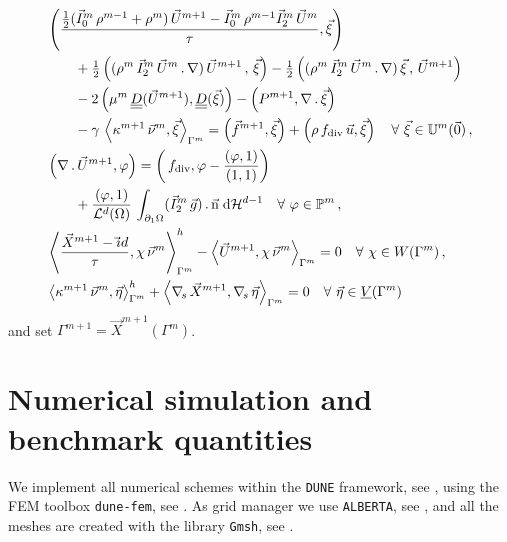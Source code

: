 \documentclass[a4paper,12pt,onecolumn]{article}
\newcommand{\vol}{\mathcal{L}^d}
\newcommand{\dH}[1]{\;{\rm d}{\cal H}^{#1}} %
\newcommand{\Vh}{\underline{V}(\Gamma^m)}
\newcommand{\Wh}{W(\Gamma^m)}
\newcommand{\uspacedisc}[2]{\mathbb{U}^{#2}(\vec{#1})}
\newcommand{\pspace}{\mathbb{P}}
\newcommand{\nabs}{\nabla_{\!s}}
\newcommand{\id}{\rm id}
\newcommand{\unitn}{\vec{\rm n}}
\newcommand{\mat}[1]{\underline{\underline{#1}}\rule{0pt}{0pt}}
\begin{document}
\begin{subequations}
\begin{align}
& \left(\frac{\tfrac{1}{2}(\vec I^m_0\,\rho^{m-1}+\rho^m)\,\vec U^{m+1} -
\vec I^m_0\,\rho^{m-1} \vec I^m_2\,\vec U^m}{\tau}, \vec \xi \right)\nonumber \\
& \qquad + \tfrac{1}{2}\left((\rho^m\,\vec I^m_2\,\vec U^m\,.\,\nabla)\,
\vec U^{m+1}\,,\,\vec \xi \right) - \tfrac{1}{2} \left((\rho^m\,
\vec I^m_2 \, \vec U^m\,.\,\nabla)\,\vec \xi\,,\,\vec U^{m+1} \right)
\nonumber \\
& \qquad - 2\left(\mu^m\,\mat D(\vec U^{m+1}), \mat D(\vec \xi) \right)
- \left(P^{m+1}, \nabla\,.\,\vec \xi\right) \nonumber \\
& \qquad - \gamma\,\left\langle
\kappa^{m+1}\,\vec\nu^m,\vec\xi\right\rangle_{\Gamma^m}
= \left(\vec f^{m+1}, \vec \xi\right)
+\left(\rho\,f_{\rm{div}}\,\vec u,\vec\xi\right) \quad \forall\ \vec\xi \in
\uspacedisc{0}{m}\,,\\
& \left(\nabla\,.\,\vec U^{m+1}, \varphi\right)  = \left(\,f_{\rm{div}},
\varphi-\frac{\left(\varphi,1\right)}{\left(1,1\right)}\right) \nonumber \\
& \qquad +\frac{\left(\varphi, 1\right)}{\vol(\Omega)}\, \int_{\partial_1\Omega}
(\vec I^m_2\,\vec g) \,.\, \unitn \dH{d-1}
\quad \forall\ \varphi \in \pspace^m\,, \\
&  \left\langle \frac{\vec X^{m+1} - \vec\id}{\tau} ,\chi\,\vec\nu^m
\right\rangle_{\Gamma^m}^h - \left\langle \vec U^{m+1}, \chi\,\vec\nu^m
\right\rangle_{\Gamma^m}  = 0 \quad \forall\ \chi \in \Wh\,,\\
& \left\langle \kappa^{m+1}\,\vec\nu^m, \vec\eta \right\rangle_{\Gamma^m}^h
+ \left\langle \nabs\,\vec X^{m+1}, \nabs\,\vec \eta \right\rangle_{\Gamma^m} =
0 \quad \forall\ \vec\eta \in \Vh
\end{align}
\end{subequations}
and set $\Gamma^{m+1} = \vec X^{m+1}(\Gamma^m)$.

\section{Numerical simulation and benchmark quantities}
\label{sec:benchmark_quantities}
We implement all numerical schemes within the \verb|DUNE| framework, see
\cite{dunegridpaperI08,dunegridpaperII08}, using the FEM toolbox
\verb|dune-fem|, see \cite{dunefempaper10}. As grid manager we use
\verb|ALBERTA|, see \cite{Alberta}, and all the meshes are created with the
library \verb|Gmsh|, see \cite{GeuzaineR09}.
\end{document}
